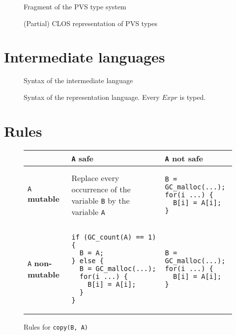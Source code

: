 \documentclass[12pt,a4paper]{article}
\newcommand{\cl}[1]{\texttt{#1}}
\newcommand{\mut}{  \textbf{ mutable } }
\newcommand{\nmut}{ \textbf{ non-mutable } }
\newcommand{\safe}{ \textbf{ safe } }
\begin{document}
\begin{figure}[!ht]

\caption{Fragment of the PVS type system}
\label{fig:PVS-types}
\end{figure}


\begin{figure}[!ht]

\caption{(Partial) CLOS representation of PVS types}
\label{fig:PVS-CLOS-types}
\end{figure}


\newpage
\section{Intermediate languages}

\begin{figure}[!ht]

\caption{Syntax of the intermediate language}
\label{fig:aux-syntax}
\end{figure}

\newpage
\begin{figure}[!ht]

\caption{Syntax of the representation language. Every $Expr$ is typed.}
\label{fig:Csyntax}
\end{figure}



\newpage
\section{Rules}
\label{Rules}


\begin{figure}[!ht]
\begin{tabular}{|p{5.5cm}|p{5.5cm}|p{6cm}|}
\hline
             & \cl{A} \safe & \cl{A} not \safe \\ \hline
\cl{A} \mut  & Replace every occurrence of the variable \cl{B} by the variable \cl{A} & \begin{lstlisting}
B = GC_malloc(...);
for(i ...) {
  B[i] = A[i];
}
\end{lstlisting} \\ \hline
\cl{A} \nmut & \begin{lstlisting}
if (GC_count(A) == 1) {
  B = A;
} else {
  B = GC_malloc(...);
  for(i ...) {
    B[i] = A[i];
  }
}
\end{lstlisting} & \begin{lstlisting}
B = GC_malloc(...);
for(i ...) {
  B[i] = A[i];
}
\end{lstlisting} \\ \hline
\end{tabular}
\caption{Rules for \cl{copy(B, A)}}
\end{figure}
\end{document}

